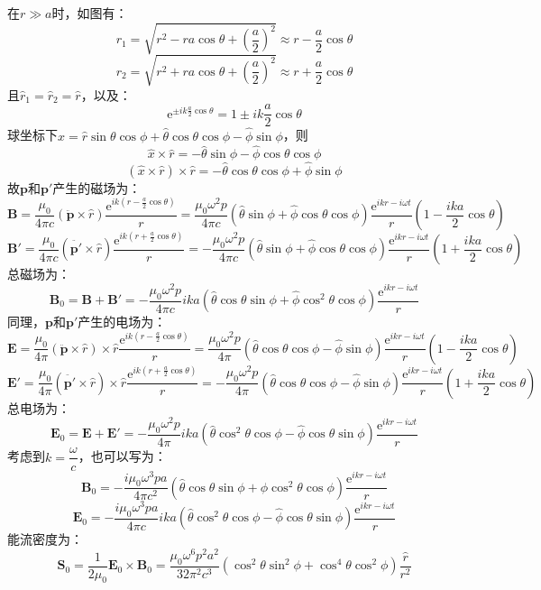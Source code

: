 \documentclass[a4paper,fontset=none]{ctexart}
\begin{document}
\begin{itemize}
        在$r\gg a$时，如图有：
        \[
            r_1 = \sqrt{r^2 - ra\cos\theta+ \left(\frac{a}{2}\right)^2} \approx r - \frac{a}{2}\cos\theta
        \]
        \[
            r_2 = \sqrt{r^2 + ra\cos\theta+ \left(\frac{a}{2}\right)^2} \approx r + \frac{a}{2}\cos\theta
        \]
        且$\hat{r}_1=\hat{r}_2=\hat{r}$，以及：
        \[
            \mathrm{e}^{\pm ik\tfrac{a}{2}\cos\theta} = 1 \pm ik\frac{a}{2}\cos\theta
        \]
        球坐标下$\hat{x}=\hat{r}\sin\theta\cos\phi+\hat{\theta}\cos\theta\cos\phi-\hat{\phi}\sin\phi$，则
        \[
            \hat{x} \times \hat{r} = -\hat{\theta}\sin\phi - \hat{\phi}\cos\theta\cos\phi
        \]
        \[
            (\hat{x} \times \hat{r}) \times \hat{r} = -\hat{\theta}\cos\theta\cos\phi + \hat{\phi}\sin\phi
        \]
        故$\bm{p}$和$\bm{p}'$产生的磁场为：
        \[
            \bm{B} = \frac{\mu_0}{4\pi c} (\ddot{\bm{p}} \times \hat{r}) \frac{\mathrm{e}^{ik\left(r - \tfrac{a}{2}\cos\theta\right)}}{r} = \frac{\mu_0\omega^2p}{4\pi c} (\hat{\theta}\sin\phi + \hat{\phi}\cos\theta\cos\phi) \frac{\mathrm{e}^{ikr-i\omega t}}{r} \left(1 - \frac{ika}{2}\cos\theta\right)
        \]
        \[
            \bm{B}' = \frac{\mu_0}{4\pi c} (\ddot{\bm{p}'} \times \hat{r}) \frac{\mathrm{e}^{ik\left(r + \tfrac{a}{2}\cos\theta\right)}}{r} = -\frac{\mu_0\omega^2p}{4\pi c} (\hat{\theta}\sin\phi + \hat{\phi}\cos\theta\cos\phi) \frac{\mathrm{e}^{ikr-i\omega t}}{r} \left(1 + \frac{ika}{2}\cos\theta\right)
        \]
        总磁场为：
        \[
            \bm{B}_0 = \bm{B} + \bm{B}' = -\frac{\mu_0\omega^2p}{4\pi c} ika(\hat{\theta}\cos\theta\sin\phi + \hat{\phi}\cos^2\theta\cos\phi) \frac{\mathrm{e}^{ikr-i\omega t}}{r}
        \]
        同理，$\bm{p}$和$\bm{p}'$产生的电场为：
        \[
            \bm{E} = \frac{\mu_0}{4\pi} (\ddot{\bm{p}} \times \hat{r}) \times \hat{r} \frac{\mathrm{e}^{ik\left(r - \tfrac{a}{2}\cos\theta\right)}}{r} = \frac{\mu_0\omega^2p}{4\pi} (\hat{\theta}\cos\theta\cos\phi - \hat{\phi}\sin\phi) \frac{\mathrm{e}^{ikr-i\omega t}}{r} \left(1 - \frac{ika}{2}\cos\theta\right)
        \]
        \[
            \bm{E}' = \frac{\mu_0}{4\pi} (\ddot{\bm{p}'} \times \hat{r}) \times \hat{r} \frac{\mathrm{e}^{ik\left(r + \tfrac{a}{2}\cos\theta\right)}}{r} = -\frac{\mu_0\omega^2p}{4\pi} (\hat{\theta}\cos\theta\cos\phi - \hat{\phi}\sin\phi) \frac{\mathrm{e}^{ikr-i\omega t}}{r} \left(1 + \frac{ika}{2}\cos\theta\right)
        \]
        总电场为：
        \[
            \bm{E}_0 = \bm{E} + \bm{E}' = -\frac{\mu_0\omega^2p}{4\pi} ika(\hat{\theta}\cos^2\theta\cos\phi - \hat{\phi}\cos\theta\sin\phi) \frac{\mathrm{e}^{ikr-i\omega t}}{r}
        \]
        考虑到$k=\dfrac{\omega}{c}$，也可以写为：
        \[
            \bm{B}_0 = -\frac{i\mu_0\omega^3pa}{4\pi c^2} (\hat{\theta}\cos\theta\sin\phi + \hat{\phi}\cos^2\theta\cos\phi) \frac{\mathrm{e}^{ikr-i\omega t}}{r}
        \]
        \[
            \bm{E}_0 = -\frac{i\mu_0\omega^3pa}{4\pi c} ika(\hat{\theta}\cos^2\theta\cos\phi - \hat{\phi}\cos\theta\sin\phi) \frac{\mathrm{e}^{ikr-i\omega t}}{r}
        \]
        能流密度为：
        \[
            \bm{S}_0 = \frac{1}{2\mu_0}\bm{E}_0 \times \bm{B}_0 = \frac{\mu_0\omega^6p^2a^2}{32\pi^2c^3}(\cos^2\theta\sin^2\phi + \cos^4\theta\cos^2\phi)\frac{\hat{r}}{r^2}
        \]


\end{itemize}
\end{document}
